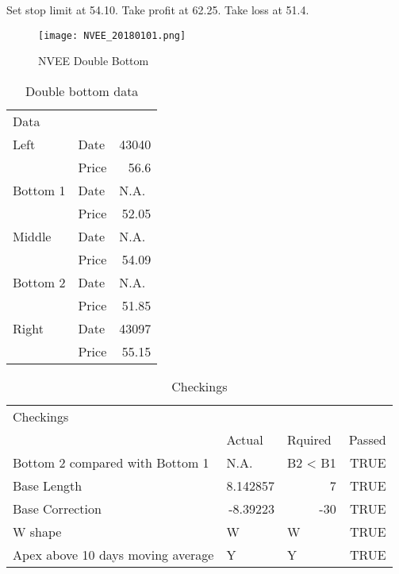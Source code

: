 \documentclass{article}
\begin{document}
Set stop limit at 54.10. Take profit at 62.25. Take loss at 51.4.

\begin{figure}
\caption{NVEE Double Bottom}
\texttt{[image: NVEE\_20180101.png]}
\label{NVEE}
\end{figure}

\begin{table}[htbp]
	\centering
	\caption{Double bottom data}
	\begin{tabular}{rlr}
		\multicolumn{1}{l}{Data} &       &  \\
		\multicolumn{1}{l}{Left} & Date  & 43040 \\
		& Price & 56.6 \\
		\multicolumn{1}{l}{Bottom 1} & Date  & \multicolumn{1}{l}{N.A.} \\
		& Price & 52.05 \\
		\multicolumn{1}{l}{Middle} & Date  & \multicolumn{1}{l}{N.A.} \\
		& Price & 54.09 \\
		\multicolumn{1}{l}{Bottom 2} & Date  & \multicolumn{1}{l}{N.A.} \\
		& Price & 51.85 \\
		\multicolumn{1}{l}{Right} & Date  & 43097 \\
		& Price & 55.15 \\
	\end{tabular}%
	\label{data}%
\end{table}%

\begin{table}[htbp]
	\centering
	\caption{Checkings}
	\begin{tabular}{lllr}
		Checkings &       &       &  \\
		& Actual & Rquired & \multicolumn{1}{l}{Passed} \\
		Bottom 2 compared with Bottom 1 & N.A.  & B2 < B1 & TRUE \\
		Base Length & \multicolumn{1}{r}{8.142857} & \multicolumn{1}{r}{7} & TRUE \\
		Base Correction & \multicolumn{1}{r}{-8.39223} & \multicolumn{1}{r}{-30} & TRUE \\
		W shape & W     & W     & TRUE \\
		Apex above 10 days moving average & Y     & Y     & TRUE \\
	\end{tabular}%
	\label{checking}%
\end{table}%
\end{document}
